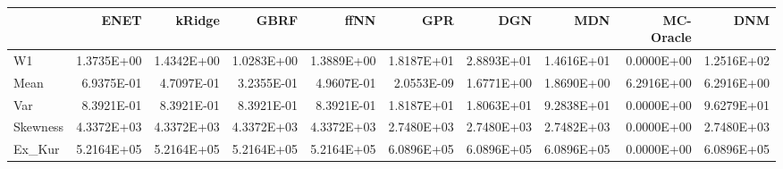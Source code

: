 \begin{tabular}{lrrrrrrrrr}
\toprule
{} &       ENET &     kRidge &       GBRF &       ffNN &        GPR &        DGN &        MDN &  MC-Oracle &        DNM \\
\midrule
W1       & 1.3735E+00 & 1.4342E+00 & 1.0283E+00 & 1.3889E+00 & 1.8187E+01 & 2.8893E+01 & 1.4616E+01 & 0.0000E+00 & 1.2516E+02 \\
Mean     & 6.9375E-01 & 4.7097E-01 & 3.2355E-01 & 4.9607E-01 & 2.0553E-09 & 1.6771E+00 & 1.8690E+00 & 6.2916E+00 & 6.2916E+00 \\
Var      & 8.3921E-01 & 8.3921E-01 & 8.3921E-01 & 8.3921E-01 & 1.8187E+01 & 1.8063E+01 & 9.2838E+01 & 0.0000E+00 & 9.6279E+01 \\
Skewness & 4.3372E+03 & 4.3372E+03 & 4.3372E+03 & 4.3372E+03 & 2.7480E+03 & 2.7480E+03 & 2.7482E+03 & 0.0000E+00 & 2.7480E+03 \\
Ex\_Kur   & 5.2164E+05 & 5.2164E+05 & 5.2164E+05 & 5.2164E+05 & 6.0896E+05 & 6.0896E+05 & 6.0896E+05 & 0.0000E+00 & 6.0896E+05 \\
\bottomrule
\end{tabular}
